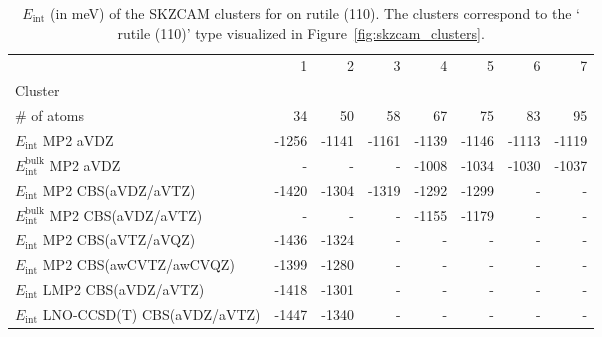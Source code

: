 \begin{table}
\caption{\label{tab:system_eint_r-tio2_h2o}$E_\textrm{int}$ (in meV) of the SKZCAM clusters for  on  rutile (110). The clusters correspond to the ` rutile (110)' type visualized in Figure~\ref{fig:skzcam_clusters}.}
\begin{adjustbox}{center,max width=1.4\textwidth}
\begin{tabular}{lrrrrrrr}
\toprule
 & 1 & 2 & 3 & 4 & 5 & 6 & 7 \\ 
Cluster &  &  &  &  &  &  &  \\
\midrule
\# of atoms & 34 & 50 & 58 & 67 & 75 & 83 & 95 \\
$E_\textrm{int}$ MP2 aVDZ & -1256 & -1141 & -1161 & -1139 & -1146 & -1113 & -1119 \\
$E_\textrm{int}^\textrm{bulk}$ MP2 aVDZ & - & - & - & -1008 & -1034 & -1030 & -1037 \\
$E_\textrm{int}$ MP2 CBS(aVDZ/aVTZ) & -1420 & -1304 & -1319 & -1292 & -1299 & - & - \\
$E_\textrm{int}^\textrm{bulk}$ MP2 CBS(aVDZ/aVTZ) & - & - & - & -1155 & -1179 & - & - \\
$E_\textrm{int}$ MP2 CBS(aVTZ/aVQZ) & -1436 & -1324 & - & - & - & - & - \\
$E_\textrm{int}$ MP2 CBS(awCVTZ/awCVQZ) & -1399 & -1280 & - & - & - & - & - \\
$E_\textrm{int}$ LMP2 CBS(aVDZ/aVTZ) & -1418 & -1301 & - & - & - & - & - \\
$E_\textrm{int}$ LNO-CCSD(T) CBS(aVDZ/aVTZ) & -1447 & -1340 & - & - & - & - & - \\
\bottomrule
\end{tabular}
\end{adjustbox}
\end{table}

